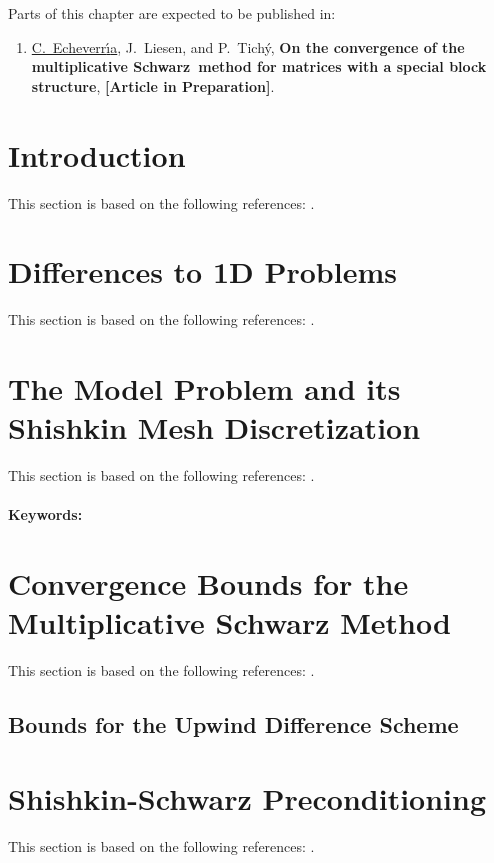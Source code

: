 \ifnum{}

Parts of this chapter are expected to be published in:
\begin{enumerate}
\item[\cite{EchLieTic19}] \underline{C.~Echeverr{\'\i}a}, J.~Liesen, and P.~Tich{\'y}, \textbf{On the convergence of the multiplicative Schwarz~method for matrices with a special block structure}, \textbf{[Article in Preparation]}.
\end{enumerate}

\section{Introduction}
This section is based on the following references: \cite{EchLieTic19}.


\section{Differences to 1D Problems}
This section is based on the following references: \cite{EchLieSzyTic18, EchLieTic19}.


\section{The Model Problem and its Shishkin Mesh Discretization}
This section is based on the following references: \cite{GriDolSil15}.
\paragraph{Keywords:}


\section{Convergence Bounds for the Multiplicative Schwarz Method}
This section is based on the following references: \cite{EchLieSzyTic18}.


\subsection{Bounds for the Upwind Difference Scheme}


\section{Shishkin-Schwarz Preconditioning}
This section is based on the following references: \cite{EchLieTic19}.


